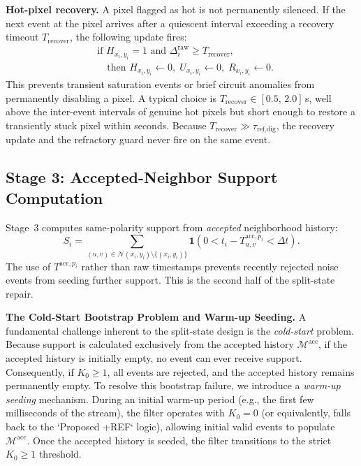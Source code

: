 \documentclass[a4paper,fleqn]{cas-dc}
\newcommand{\ind}[1]{\mathbf{1}\!\left(#1\right)}
\begin{document}
\textbf{Hot-pixel recovery.}
A pixel flagged as hot is not permanently silenced. If the next event at the pixel arrives after a quiescent interval exceeding a recovery timeout $T_{\text{recover}}$, the following update fires:
\begin{equation}
\begin{split}
&\text{if } H_{x_i,y_i}=1 \text{ and } \Delta_i^{\text{raw}} \geq T_{\text{recover}}, \\
&\quad \text{then } H_{x_i,y_i} \gets 0,\; U_{x_i,y_i} \gets 0,\; R_{x_i,y_i} \gets 0.
\end{split}
\label{eq:hotpixel_recovery}
\end{equation}
This prevents transient saturation events or brief circuit anomalies from permanently disabling a pixel. A typical choice is $T_{\text{recover}} \in [0.5,\,2.0]$\,s, well above the inter-event intervals of genuine hot pixels but short enough to restore a transiently stuck pixel within seconds. Because $T_{\text{recover}}\gg\tau_{\text{ref,dig}}$, the recovery update and the refractory guard never fire on the same event.

\subsection{Stage 3: Accepted-Neighbor Support Computation}
\label{sec:support}

Stage~3 computes same-polarity support from \emph{accepted} neighborhood history:
\begin{equation}
S_i =
\sum_{(u,v) \in \mathcal{N}(x_i,y_i)\setminus\{(x_i,y_i)\}}
\ind{0 < t_i - T_{u,v}^{\text{acc},p_i} < \Delta t}.
\label{eq:support}
\end{equation}
The use of $T^{\text{acc},p_i}$ rather than raw timestamps prevents recently rejected noise events from seeding further support. This is the second half of the split-state repair.

\textbf{The Cold-Start Bootstrap Problem and Warm-up Seeding.}
A fundamental challenge inherent to the split-state design is the \emph{cold-start} problem. Because support is calculated exclusively from the accepted history $\mathcal{M}^{\text{acc}}$, if the accepted history is initially empty, no event can ever receive support. Consequently, if $K_0 \geq 1$, all events are rejected, and the accepted history remains permanently empty. To resolve this bootstrap failure, we introduce a \emph{warm-up seeding} mechanism. During an initial warm-up period (e.g., the first few milliseconds of the stream), the filter operates with $K_0 = 0$ (or equivalently, falls back to the `Proposed +REF` logic), allowing initial valid events to populate $\mathcal{M}^{\text{acc}}$. Once the accepted history is seeded, the filter transitions to the strict $K_0 \geq 1$ threshold.
\end{document}
